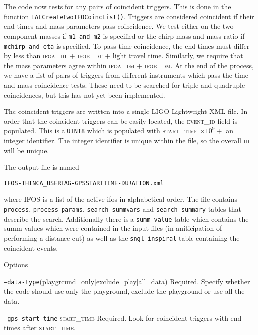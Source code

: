 \begin{entry}
The code now tests for any pairs of coincident triggers.  This is done in the
function \texttt{LALCreateTwoIFOCoincList()}.  Triggers are considered
coincident if their end times and mass parameters pass coincidence.  We test
either on the two component masses if \texttt{m1\_and\_m2} is specified or the
chirp mass and mass ratio if \texttt{mchirp\_and\_eta} is specified.  To pass
time coincidence, the end times must differ by less than \textsc{ifoa\_dt} $+$
\textsc{ifob\_dt} $+$ light travel time.  Similarly, we require that the mass
parameters agree within \textsc{ifoa\_dm} $+$ \textsc{ifob\_dm}.
At the end of the process, we
have a list of pairs of triggers from different instruments which pass the
time and mass coincidence tests.  These need to be searched for triple and
quadruple coincidences, but this has not yet been implemented.

The coincident triggers are written into a single LIGO Lightweight XML file.
In order that the coincident triggers can be easily located, the
\textsc{event\_id} field is populated.  This is a \texttt{UINT8} which is
populated with \textsc{start\_time} $\times 10^{9} +$ an integer identifier.
The integer identifier is unique within the file, so the overall \textsc{id}
will be unique.  

The output file is named
\begin{center}
\texttt{IFOS-THINCA\_USERTAG-GPSSTARTTIME-DURATION.xml}\\
\end{center}
where \textsc{IFOS} is a list of the active ifos in alphabetical order.  The
file contains \texttt{process}, \texttt{process\_params},
\texttt{search\_summvars} and \texttt{search\_summary} tables that describe
the search.  Additionally there is a \texttt{summ\_value} table which contains
the summ values which were contained in the input files (in aniticipation of
performing a distance cut) as well as the \texttt{sngl\_inspiral} table
containing the coincident events.

\item[Options]\leavevmode
\begin{entry}

\item[\texttt{--data-type}(playground\_only|exclude\_play|all\_data)]
Required.  Specify whether the code should use only the playground, exclude
the playground or use all the data. 

\item[\texttt{--gps-start-time} \textsc{start\_time}] Required.  Look
for coincident triggers with end times after \textsc{start\_time}.


\end{entry}
\end{entry}
